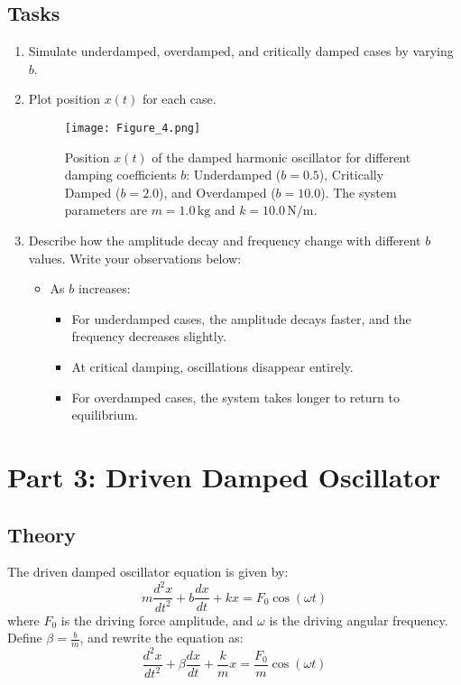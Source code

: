 \documentclass {article}
\begin{document}
\subsection*{Tasks}
\begin{enumerate}
    \item Simulate underdamped, overdamped, and critically damped cases by varying $b$.
    \item Plot position $x(t)$ for each case.
    \begin{figure}[H]
    \centering
    \texttt{[image: Figure\_4.png]}
    \caption{Position $x(t)$ of the damped harmonic oscillator for different damping coefficients $b$: Underdamped ($b=0.5$), Critically Damped ($b=2.0$), and Overdamped ($b=10.0$). The system parameters are $m=1.0 \, \text{kg}$ and $k=10.0 \, \text{N/m}$.}
    \label{fig:damped_oscillator}
\end{figure}
    \item Describe how the amplitude decay and frequency change with different $b$ values. Write your observations below:
    \begin{itemize}
        \item As $b$ increases:
        \begin{itemize}
            \item For underdamped cases, the amplitude decays faster, and the frequency decreases slightly.
            \item At critical damping, oscillations disappear entirely.
            \item For overdamped cases, the system takes longer to return to equilibrium.
        \end{itemize}
    \end{itemize}
\end{enumerate}

\section*{Part 3: Driven Damped Oscillator}
\subsection*{Theory}
The driven damped oscillator equation is given by:
\[ m \frac{d^2x}{dt^2} + b \frac{dx}{dt} + kx = F_0 \cos(\omega t) \]
where $F_0$ is the driving force amplitude, and $\omega$ is the driving angular frequency.
Define \( \beta = \frac{b}{m} \), and rewrite the equation as:
\[ \frac{d^2x}{dt^2} + \beta \frac{dx}{dt} + \frac{k}{m}x = \frac{F_0}{m} \cos(\omega t) \]
\end{document}
